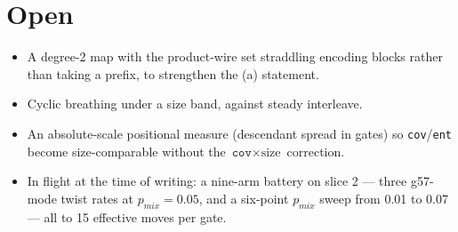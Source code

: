 \documentclass[11pt]{article}
\begin{document}
\section{Open}

\begin{itemize}
\item A degree-2 map with the product-wire set straddling encoding blocks rather
than taking a prefix, to strengthen the (a) statement.
\item Cyclic breathing under a size band, against steady interleave.
\item An absolute-scale positional measure (descendant spread in gates) so
\texttt{cov}/\texttt{ent} become size-comparable without the
$\texttt{cov}\times\text{size}$ correction.
\item In flight at the time of writing: a nine-arm battery on slice 2 --- three
g57-mode twist rates at $p_{mix}=0.05$, and a six-point $p_{mix}$ sweep from
0.01 to 0.07 --- all to 15 effective moves per gate.
\end{itemize}
\end{document}
